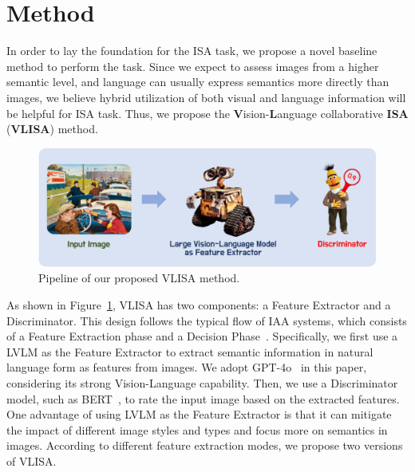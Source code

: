 \section{Method}

In order to lay the foundation for the ISA task, we propose a novel baseline method to perform the task.
Since we expect to assess images from a higher semantic level, and language can usually express semantics more directly than images, we believe hybrid utilization of both visual and language information will be helpful for ISA task. 
Thus, we propose the \textbf{V}ision-\textbf{L}anguage collaborative \textbf{ISA} (\textbf{VLISA}) method.


\begin{figure}[H]
    \centering
    \includegraphics[scale=0.33]{figs/pipeline2.pdf}
    \caption{Pipeline of our proposed VLISA method. }
    \label{method}
\end{figure}

As shown in Figure~\ref{method}, VLISA has two components: a Feature Extractor and a Discriminator.
This design follows the typical flow of IAA systems, which consists of a Feature Extraction phase and a Decision Phase~\cite{deng2017image}.
Specifically, we first use a LVLM as the Feature Extractor to extract semantic information in natural language form as features from images.
We adopt GPT-4o~\cite{gpt4} in this paper, considering its strong Vision-Language capability.
Then, we use a Discriminator model, such as BERT~\cite{devlin-etal-2019-bert}, to rate the input image based on the extracted features.
One advantage of using LVLM as the Feature Extractor is that it can mitigate the impact of different image styles and types and focus more on semantics in images.
According to different feature extraction modes, we propose two versions of VLISA.

